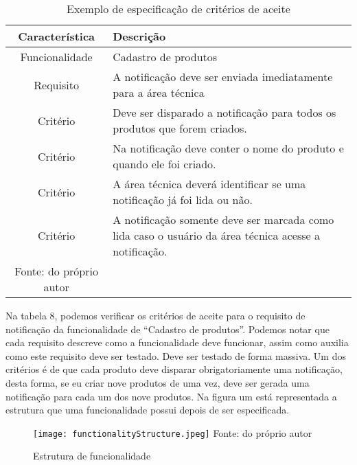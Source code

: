       \begin{table}[h!]
        \centering
        \label{Tabela:8}
        \caption{Exemplo de especificação de critérios de aceite}
        \begin{tabular}{c p{9cm}}
          \hline
          \textbf{Característica} &
          \textbf{Descrição} \\
          \hline
          Funcionalidade &
          Cadastro de produtos \\
          Requisito &
          A notificação deve ser enviada imediatamente para a área técnica \\
          Critério &
          Deve ser disparado a notificação para todos os produtos que forem criados. \\
          Critério &
          Na notificação deve conter o nome do produto e quando ele foi criado. \\
          Critério &
          A área técnica deverá identificar se uma notificação já foi lida ou não. \\
          Critério &
          A notificação somente deve ser marcada como lida caso o usuário da área
          técnica acesse a notificação. \\ \hline
          \newline
          \small{Fonte: do próprio autor}
        \end{tabular}
      \end{table}

      Na tabela 8, podemos verificar os critérios de aceite para o requisito de
      notificação da funcionalidade de “Cadastro de produtos”. Podemos notar que cada
      requisito descreve como a funcionalidade deve funcionar, assim como auxilia
      como este requisito deve ser testado. Deve ser testado de forma massiva.
      Um dos critérios é de que cada produto deve disparar obrigatoriamente uma
      notificação, desta forma, se eu criar nove produtos de uma vez, deve ser
      gerada uma notificação para cada um dos nove produtos. Na figura um está
      representada a estrutura que uma funcionalidade possui depois de ser
      especificada. \newline

      \begin{figure}[h!]
        \label{Imagem:1}
        \caption{Estrutura de funcionalidade}
        \texttt{[image: functionalityStructure.jpeg]}
        \newline
        \small{Fonte: do próprio autor}
      \end{figure}

